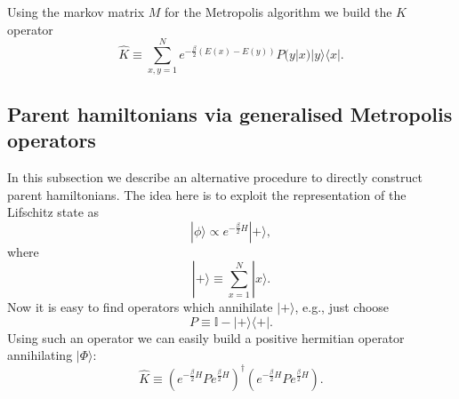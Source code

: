 \documentclass[twocolumn,lengthcheck,superscriptaddress]{revtex4-1}
\theoremstyle{definition}
\theoremstyle{remark}
\begin{document}
Using the markov matrix $M$ for the Metropolis algorithm we build the $K$ operator
\begin{equation}
	\widehat{K} \equiv \sum_{x,y=1}^N e^{-\frac{\beta}{2}(E(x)-E(y))} P(y|x) |y\rangle\langle x|.
\end{equation}


\subsection{Parent hamiltonians via generalised Metropolis operators}
In this subsection we describe an alternative procedure to directly construct parent hamiltonians. The idea here is to exploit the representation of the Lifschitz state as
\begin{equation}
	|\phi\rangle \propto e^{-\frac{\beta}{2} H}|+\rangle,
\end{equation}
where
\begin{equation}
	|+\rangle \equiv \sum_{x=1}^N |x\rangle.
\end{equation}
Now it is easy to find operators which annihilate $|+\rangle$, e.g., just choose
\begin{equation}
	P \equiv \mathbb{I} - |+\rangle\langle+|.
\end{equation}
Using such an operator we can easily build a positive hermitian operator annihilating $|\Phi\rangle$:
\begin{equation}
	\widehat{K} \equiv  \left(e^{-\frac{\beta}{2} H} P e^{\frac{\beta}{2} H} \right)^\dag\left(e^{-\frac{\beta}{2} H} P e^{\frac{\beta}{2} H} \right).
\end{equation}
\end{document}
